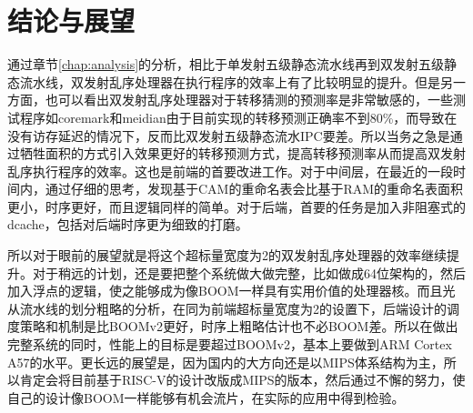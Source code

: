 \chapter{结论与展望}\label{chap:future}

	通过章节\ref{chap:analysis}的分析，相比于单发射五级静态流水线再到双发射五级静态流水线，双发射乱序处理器在执行程序的效率上有了比较明显的提升。但是另一方面，也可以看出双发射乱序处理器对于转移猜测的预测率是非常敏感的，一些测试程序如coremark和meidian由于目前实现的转移预测正确率不到80\%，而导致在没有访存延迟的情况下，反而比双发射五级静态流水IPC要差。所以当务之急是通过牺牲面积的方式引入效果更好的转移预测方式，提高转移预测率从而提高双发射乱序执行程序的效率。这也是前端的首要改进工作。对于中间层，在最近的一段时间内，通过仔细的思考，发现基于CAM的重命名表会比基于RAM的重命名表面积更小，时序更好，而且逻辑同样的简单。对于后端，首要的任务是加入非阻塞式的dcache，包括对后端时序更为细致的打磨。
	
	所以对于眼前的展望就是将这个超标量宽度为2的双发射乱序处理器的效率继续提升。对于稍远的计划，还是要把整个系统做大做完整，比如做成64位架构的，然后加入浮点的逻辑，使之能够成为像BOOM一样具有实用价值的处理器核。而且光从流水线的划分粗略的分析，在同为前端超标量宽度为2的设置下，后端设计的调度策略和机制是比BOOMv2更好，时序上粗略估计也不必BOOM差。所以在做出完整系统的同时，性能上的目标是要超过BOOMv2，基本上要做到ARM Cortex A57的水平。更长远的展望是，因为国内的大方向还是以MIPS体系结构为主，所以肯定会将目前基于RISC-V的设计改版成MIPS的版本，然后通过不懈的努力，使自己的设计像BOOM一样能够有机会流片，在实际的应用中得到检验。
	
	
	